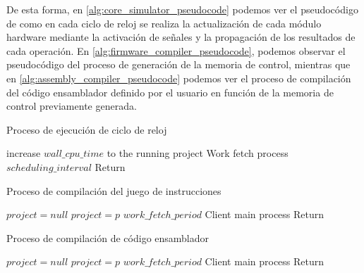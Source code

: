 De esta forma, en \ref{alg:core_simulator_pseudocode} podemos ver el pseudocódigo de como en cada ciclo de reloj se realiza la actualización de cada módulo hardware mediante la activación de señales y la propagación de los resultados de cada operación. En \ref{alg:firmware_compiler_pseudocode}, podemos observar el pseudocódigo del proceso de generación de la memoria de control, mientras que en \ref{alg:assembly_compiler_pseudocode} podemos ver el proceso de compilación del código ensamblador definido por el usuario en función de la memoria de control previamente generada.

\vspace{1cm}

\begin{algorithm}[h]
	\caption{Proceso de ejecución de ciclo de reloj}
	\label{alg:core_simulator_pseudocode}
  	\scriptsize
	\begin{algorithmic}[1]
		\State increase $wall\_cpu\_time$ to the running project
		\State {}
		\State {}
		\State {}
		\State {} Work fetch process
		\State {} $scheduling\_interval$
		\EndWhile	
		\State Return
		\EndFunction
	\end{algorithmic}
\end{algorithm}

\clearpage

\begin{algorithm}[h]
	\caption{Proceso de compilación del juego de instrucciones}
	\label{alg:firmware_compiler_pseudocode}
  	\scriptsize
	\begin{algorithmic}[1]
		\State $project = null$
		\State $project = p$
		\EndIf
		\EndFor
		\State {}
		\EndIf		
		\State {} $work\_fetch\_period$
		\EndWhile	
		\State {} Client main process
		\State Return
		\EndFunction
	\end{algorithmic}
\end{algorithm}

\begin{algorithm}[h]
	\caption{Proceso de compilación de código ensamblador}
	\label{alg:assembly_compiler_pseudocode}
  	\scriptsize
	\begin{algorithmic}[1]
		\State $project = null$
		\State $project = p$
		\EndIf
		\EndFor
		\State {}
		\EndIf		
		\State {} $work\_fetch\_period$
		\EndWhile	
		\State {} Client main process
		\State Return
		\EndFunction
	\end{algorithmic}
\end{algorithm}


